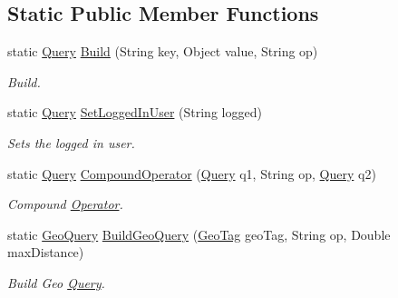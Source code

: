 \subsection*{Static Public Member Functions}
\begin{DoxyCompactItemize}
\item 
static \hyperlink{classcom_1_1shephertz_1_1app42_1_1paas_1_1sdk_1_1csharp_1_1storage_1_1_query}{Query} \hyperlink{classcom_1_1shephertz_1_1app42_1_1paas_1_1sdk_1_1csharp_1_1storage_1_1_query_builder_addc2fd57e1b5550edf5d6404a6755495}{Build} (String key, Object value, String op)
\begin{DoxyCompactList}\small\item\em Build. \end{DoxyCompactList}\item 
static \hyperlink{classcom_1_1shephertz_1_1app42_1_1paas_1_1sdk_1_1csharp_1_1storage_1_1_query}{Query} \hyperlink{classcom_1_1shephertz_1_1app42_1_1paas_1_1sdk_1_1csharp_1_1storage_1_1_query_builder_aa5727689fbe9fc910e3a61d76695bf17}{Set\+Logged\+In\+User} (String logged)
\begin{DoxyCompactList}\small\item\em Sets the logged in user. \end{DoxyCompactList}\item 
static \hyperlink{classcom_1_1shephertz_1_1app42_1_1paas_1_1sdk_1_1csharp_1_1storage_1_1_query}{Query} \hyperlink{classcom_1_1shephertz_1_1app42_1_1paas_1_1sdk_1_1csharp_1_1storage_1_1_query_builder_a8878f9531fed2e8f2749e1bf64c47c45}{Compound\+Operator} (\hyperlink{classcom_1_1shephertz_1_1app42_1_1paas_1_1sdk_1_1csharp_1_1storage_1_1_query}{Query} q1, String op, \hyperlink{classcom_1_1shephertz_1_1app42_1_1paas_1_1sdk_1_1csharp_1_1storage_1_1_query}{Query} q2)
\begin{DoxyCompactList}\small\item\em Compound \hyperlink{classcom_1_1shephertz_1_1app42_1_1paas_1_1sdk_1_1csharp_1_1storage_1_1_operator}{Operator}. \end{DoxyCompactList}\item 
static \hyperlink{classcom_1_1shephertz_1_1app42_1_1paas_1_1sdk_1_1csharp_1_1storage_1_1_geo_query}{Geo\+Query} \hyperlink{classcom_1_1shephertz_1_1app42_1_1paas_1_1sdk_1_1csharp_1_1storage_1_1_query_builder_a35915d27dddeee799200893bb03bc614}{Build\+Geo\+Query} (\hyperlink{classcom_1_1shephertz_1_1app42_1_1paas_1_1sdk_1_1csharp_1_1storage_1_1_geo_tag}{Geo\+Tag} geo\+Tag, String op, Double max\+Distance)
\begin{DoxyCompactList}\small\item\em Build Geo \hyperlink{classcom_1_1shephertz_1_1app42_1_1paas_1_1sdk_1_1csharp_1_1storage_1_1_query}{Query}. \end{DoxyCompactList}\end{DoxyCompactItemize}
